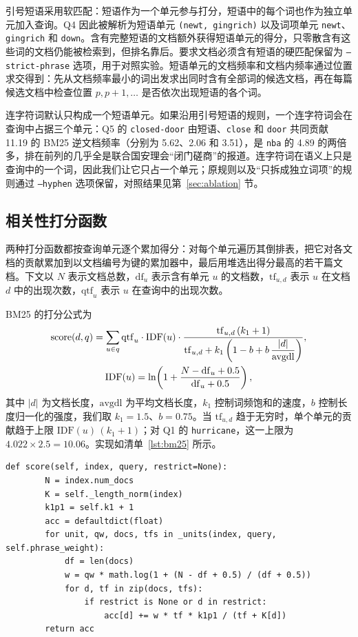 \documentclass[12pt,a4paper]{ctexart}
\begin{document}
引号短语采用软匹配：短语作为一个单元参与打分，短语中的每个词也作为独立单元加入查询。Q4 因此被解析为短语单元 \texttt{(newt, gingrich)} 以及词项单元 \texttt{newt}、\texttt{gingrich} 和 \texttt{down}。含有完整短语的文档额外获得短语单元的得分，只零散含有这些词的文档仍能被检索到，但排名靠后。要求文档必须含有短语的硬匹配保留为 \texttt{--strict-phrase} 选项，用于对照实验。短语单元的文档频率和文档内频率通过位置求交得到：先从文档频率最小的词出发求出同时含有全部词的候选文档，再在每篇候选文档中检查位置 $p, p+1, \dots$ 是否依次出现短语的各个词。

连字符词默认只构成一个短语单元。如果沿用引号短语的规则，一个连字符词会在查询中占据三个单元：Q5 的 \texttt{closed-door} 由短语、\texttt{close} 和 \texttt{door} 共同贡献 11.19 的 BM25 逆文档频率（分别为 5.62、2.06 和 3.51），是 \texttt{nba} 的 4.89 的两倍多，排在前列的几乎全是联合国安理会“闭门磋商”的报道。连字符词在语义上只是查询中的一个词，因此我们让它只占一个单元；原规则以及“只拆成独立词项”的规则通过 \texttt{--hyphen} 选项保留，对照结果见第~\ref{sec:ablation} 节。

\subsection{相关性打分函数}

两种打分函数都按查询单元逐个累加得分：对每个单元遍历其倒排表，把它对各文档的贡献累加到以文档编号为键的累加器中，最后用堆选出得分最高的若干篇文档。下文以 $N$ 表示文档总数，$\mathrm{df}_u$ 表示含有单元 $u$ 的文档数，$\mathrm{tf}_{u,d}$ 表示 $u$ 在文档 $d$ 中的出现次数，$\mathrm{qtf}_u$ 表示 $u$ 在查询中的出现次数。

BM25 的打分公式为
\begin{gather}
\mathrm{score}(d, q) = \sum_{u \in q} \mathrm{qtf}_u \cdot \mathrm{IDF}(u) \cdot
\frac{\mathrm{tf}_{u,d}\,(k_1 + 1)}{\mathrm{tf}_{u,d} + k_1\left(1 - b + b\,\dfrac{|d|}{\mathrm{avgdl}}\right)},
\label{eq:bm25} \\
\mathrm{IDF}(u) = \ln\!\left(1 + \frac{N - \mathrm{df}_u + 0.5}{\mathrm{df}_u + 0.5}\right), \notag
\end{gather}
其中 $|d|$ 为文档长度，$\mathrm{avgdl}$ 为平均文档长度，$k_1$ 控制词频饱和的速度，$b$ 控制长度归一化的强度，我们取 $k_1 = 1.5$、$b = 0.75$。当 $\mathrm{tf}_{u,d}$ 趋于无穷时，单个单元的贡献趋于上限 $\mathrm{IDF}(u)\,(k_1+1)$；对 Q1 的 \texttt{hurricane}，这一上限为 $4.022 \times 2.5 = 10.06$。实现如清单~\ref{lst:bm25} 所示。

\begin{lstlisting}[caption={BM25 打分}, label={lst:bm25}, gobble=4]
    def score(self, index, query, restrict=None):
        N = index.num_docs
        K = self._length_norm(index)
        k1p1 = self.k1 + 1
        acc = defaultdict(float)
        for unit, qw, docs, tfs in _units(index, query, self.phrase_weight):
            df = len(docs)
            w = qw * math.log(1 + (N - df + 0.5) / (df + 0.5))
            for d, tf in zip(docs, tfs):
                if restrict is None or d in restrict:
                    acc[d] += w * tf * k1p1 / (tf + K[d])
        return acc
\end{lstlisting}
\end{document}
